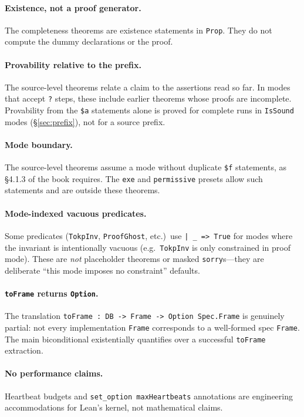 \documentclass[11pt]{article}
\newcommand{\lean}[1]{\lstinline[language=Lean4]{#1}}
\begin{document}
\paragraph{Existence, not a proof generator.}
The completeness theorems are existence statements in \lean{Prop}.  They
do not compute the dummy declarations or the proof.

\paragraph{Provability relative to the prefix.}
The source-level theorems relate a claim to the assertions read so far.
In modes that accept \verb|?| steps, these include earlier theorems
whose proofs are incomplete.  Provability from the \verb|$a| statements
alone is proved for complete runs in \lean{IsSound} modes
(\S\ref{sec:prefix}), not for a source prefix.

\paragraph{Mode boundary.}
The source-level theorems assume a mode without duplicate \verb|$f|
statements, as \S4.1.3 of the book requires.  The \lean{exe} and \lean{permissive}
presets allow such statements and are outside these theorems.

\paragraph{Mode-indexed vacuous predicates.}
Some predicates
(\lean{TokpInv}, \lean{ProofGhost}, etc.)\ use
\texttt{|~\_~=>~True} for modes
where the invariant is intentionally vacuous (e.g.\ \lean{TokpInv} is
only constrained in proof mode).  These are \emph{not} placeholder
theorems or masked \lean{sorry}s---they are deliberate
``this mode imposes no constraint'' defaults.

\paragraph{\texttt{toFrame} returns \texttt{Option}.}
The translation \lean{toFrame : DB -> Frame -> Option Spec.Frame} is
genuinely partial: not every implementation \lean{Frame} corresponds
to a well-formed spec \lean{Frame}.  The main biconditional existentially
quantifies over a successful \lean{toFrame} extraction.

\paragraph{No performance claims.}
Heartbeat budgets and \lean{set_option maxHeartbeats} annotations are
engineering accommodations for Lean's kernel, not mathematical claims.
\end{document}
